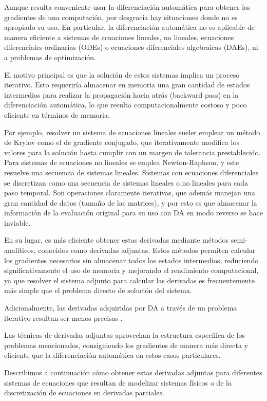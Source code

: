 Aunque resulta conveniente usar la diferenciación automática para obtener los
gradientes de una computación, por desgracia hay situaciones donde no es
apropiado su uso. En particular, la diferenciación automática no es aplicable
de manera eficiente a sistemas de ecuaciones lineales, no lineales, ecuaciones
diferenciales ordinarias (ODEs) o ecuaciones diferenciales algebraicas (DAEs),
ni a problemas de optimización.

El motivo principal es que la solución de estos sistemas implica un proceso
iterativo. Esto requeriría almacenar en memoria una gran cantidad de estados
intermedios para realizar la propagación hacia atrás (backward pass) en la
diferenciación automática, lo que resulta computacionalmente costoso y poco
eficiente en términos de memoria.

Por ejemplo, resolver un sistema de ecuaciones lineales sueler emplear un
método de Krylov como el de gradiente conjugado, que iterativamente modifica
los valores para la solución hasta cumplir con un margen de tolerancia
prestablecido. Para sistemas de ecuaciones no lineales se emplea
Newton-Raphson, y este resuelve una secuencia de sistemas lineales. Sistemas
con ecuaciones diferenciales se discretizan como una secuencia de sistemas
lineales o no lineales para cada paso temporal. Son operaciones claramente
iterativas, que además manejan una gran cantidad de datos (tamaño de las
matrices), y por esto es que almacenar la información de la evaluación original
para su uso con DA en modo reverso se hace inviable.

En su lugar, es más eficiente obtener estas derivadas mediante métodos
semi-analíticos, conocidos como derivadas adjuntas. Estos métodos permiten
calcular los gradientes necesarios sin almacenar todos los estados intermedios,
reduciendo significativamente el uso de memoria y mejorando el rendimiento
computacional, ya que resolver el sistema adjunto para calcular las derivadas
es frecuentemente más simple que el problema directo de solución del sistema.

Adicionalmente, las derivadas adquiridas por DA a través de un problema
iterativo resultan ser menos precisas \cite{scieur2022curse}.

Las técnicas de derivadas adjuntas aprovechan la estructura específica de los
problemas mencionados, consiguiendo los gradientes de manera más directa y
eficiente que la diferenciación automática en estos casos particulares.

Describimos a continuación cómo obtener estas derivadas adjuntas para
diferentes sistemas de ecuaciones que resultan de modelizar sistemas físicos o
de la discretización de ecuaciones en derivadas parciales.

